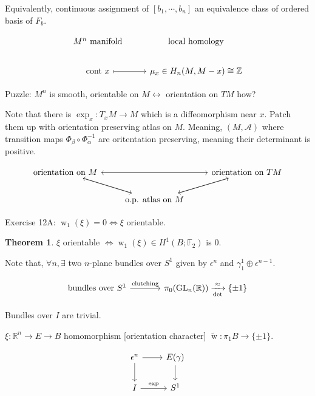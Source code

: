\documentclass{article}
\theoremstyle{definition}
\newtheorem{theorem}{Theorem}
\begin{document}
    Equivalently, continuous assignment of \([b_1 , \cdots , b_n]\) an equivalence class of ordered basis of \(F_b\).
    
    \[
        \begin{tikzcd}
            M^n \text{ manifold} & \text{local homology} \\
            \text{cont } x \ar[r,mapsto] & \mu_x \in H_n(M, M-x) \cong \mathbb{Z}
        \end{tikzcd}
    \]

    Puzzle: \(M^n\) is smooth, orientable on \(M \leftrightarrow\) orientation on \(TM\) how?
    
    Note that there is \(\exp_x : T_x M \to M\) which is a diffeomorphism near \(x\). Patch them up with orientation preserving atlas on \(M\). Meaning, \((M,\mathcal{A})\) where transition maps \(\Phi_\beta \circ \Phi_\alpha ^{-1}\) are oritentation preserving, meaning their determinant is positive.

    \[
        \begin{tikzcd}
            \text{orientation on } M \ar[rr] \ar[rd] & & \text{orientation on } TM \ar[ll] \ar[ld] \\ & \text{o.p. atlas on } M \ar[ur] \ar[ul]
        \end{tikzcd}
    \]

    Exercise 12A: \(\operatorname{w}_1(\xi) =  0 \iff \xi\) orientable.
    
    \begin{theorem}
        \(\xi\) orientable \(\iff \operatorname{w}_1(\xi) \in H^1(B;\mathbb{F}_2)\) is \(0\).
    \end{theorem}

    Note that, \(\forall n, \exists\) two \(n\)-plane bundles over \(S^1\) given by \(\epsilon^n\) and \(\gamma^1_1 \oplus \epsilon^{n-1}\).

    \[
        \begin{tikzcd}[column sep = large]
            \text{bundles over } S^1 \ar[r, "\text{clutching}"] & \pi_0(\text{GL}_n(\mathbb{R})) \xrightarrow[\det]{\approx} \{ \pm 1 \}
        \end{tikzcd}
    \]

    Bundles over \(I\) are trivial.

    \(\xi : \mathbb{R}^n \to E \to B\) homomorphism [orientation character] \(\widetilde{\operatorname{w}}: \pi_1 B \to \{ \pm 1 \}\).

    \[
        \begin{tikzcd}
            \epsilon^n \ar[r] \ar[d] & E(\gamma) \ar[d] \\ I \ar[r,"\exp"] & S^1
        \end{tikzcd}
    \]
\end{document}
